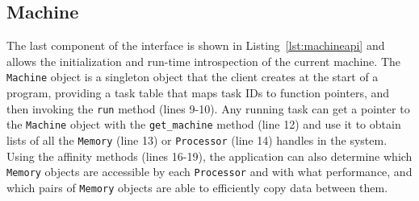




\subsection{Machine}
\label{subsec:machmodel}
The last component of the interface is shown in Listing~\ref{lst:machineapi} and allows the
initialization and run-time introspection
of the current machine.
The {\tt Machine} object is a singleton object that the client creates at the start of a
program, providing a task table that maps task IDs to function pointers,
and then invoking the {\tt run} method (lines 9-10).
Any running task can get a pointer to the {\tt Machine} object with the
{\tt get\_machine} method (line 12) and use it to obtain lists of all the {\tt Memory} (line 13) or 
{\tt Processor} (line 14) handles in the system.  Using the affinity methods (lines 16-19),
the application can also determine which {\tt Memory} objects are accessible by each
{\tt Processor} and with what performance, and which pairs of {\tt Memory} objects are able to
efficiently copy data between them.

